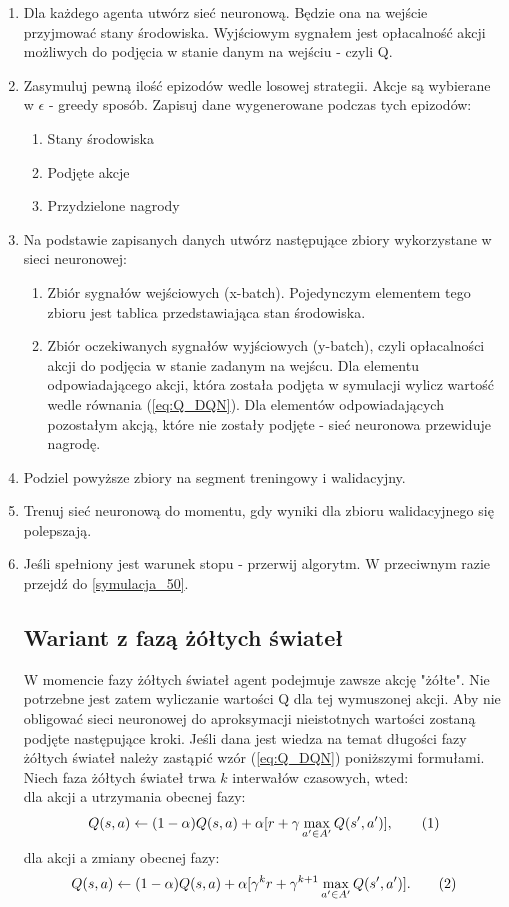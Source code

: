 \documentclass[12pt]{book}
\theoremstyle{plain}
\newcommand\addtag{\refstepcounter{equation}
\renewcommand{\labelenumii}{\theenumii}
\renewcommand{\theenumii}{\theenumi.\arabic{enumii}.}
\tag{\theequation}}
\newcommand{\myref}[1]{(\ref{#1})}
\begin{document}
\begin{enumerate}
	\item Dla każdego agenta utwórz sieć neuronową. Będzie ona na wejście przyjmować stany środowiska. Wyjściowym sygnałem jest opłacalność akcji możliwych do podjęcia w stanie danym na wejściu - czyli Q.
	\item Zasymuluj pewną ilość epizodów wedle losowej strategii. Akcje są wybierane w $\epsilon$ - greedy sposób. Zapisuj dane wygenerowane podczas tych epizodów: \label{symulacja_50}
	\begin{enumerate}
		\item Stany środowiska
		\item Podjęte akcje
		\item Przydzielone nagrody
	\end{enumerate}
\item Na podstawie zapisanych danych utwórz następujące zbiory wykorzystane w sieci neuronowej:
\begin{enumerate}
\item Zbiór sygnałów wejściowych (x-batch). Pojedynczym elementem tego zbioru jest tablica przedstawiająca stan środowiska.
\item Zbiór oczekiwanych sygnałów wyjściowych (y-batch), czyli opłacalności akcji do podjęcia w stanie zadanym na wejścu.
Dla elementu odpowiadającego akcji, która została podjęta w symulacji wylicz wartość wedle równania \myref{eq:Q_DQN}. Dla elementów odpowiadających pozostałym akcją, które nie zostały podjęte - sieć neuronowa przewiduje nagrodę. 
\end{enumerate}
\item Podziel powyższe zbiory na segment treningowy i walidacyjny.
\item Trenuj sieć neuronową do momentu, gdy wyniki dla zbioru walidacyjnego się polepszają.
\item Jeśli spełniony jest warunek stopu - przerwij algorytm. W przeciwnym razie przejdź do \ref{symulacja_50}.

\subsection{Wariant z fazą żółtych świateł}
W momencie fazy żółtych świateł agent podejmuje zawsze akcję "żółte". Nie potrzebne jest zatem wyliczanie wartości Q dla tej wymuszonej akcji. Aby nie obligować sieci neuronowej do aproksymacji nieistotnych wartości zostaną podjęte następujące kroki.
Jeśli dana jest wiedza na temat długości fazy żółtych świateł należy zastąpić wzór \myref{eq:Q_DQN} poniższymi formułami. Niech faza żółtych świateł trwa $k$ interwałów czasowych, wted: \\
dla akcji a utrzymania obecnej fazy:
\[Q(s,a) \leftarrow (1-\alpha)Q(s,a) + \alpha [r + \gamma \max_{a' \in A'} Q(s',a')], \addtag \label{eq:Q_DQN_I} \]
dla akcji a zmiany obecnej fazy:
\[Q(s,a) \leftarrow  (1-\alpha)Q(s,a) + \alpha [\gamma^{k} r + \gamma^{k+1} \max_{a' \in A'} Q(s',a')]. \addtag \label{eq:Q_DQN_II} \]

\end{enumerate}





\end{document}
